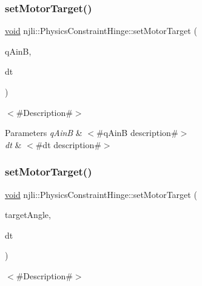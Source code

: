 \subsubsection{\texorpdfstring{set\+Motor\+Target()}{setMotorTarget()}\hspace{0.1cm}{\footnotesize\ttfamily [1/2]}}
{\footnotesize\ttfamily \mbox{\hyperlink{_thread_8h_af1e856da2e658414cb2456cb6f7ebc66}{void}} njli\+::\+Physics\+Constraint\+Hinge\+::set\+Motor\+Target (\begin{DoxyParamCaption}\item[{const bt\+Quaternion \&}]{q\+AinB,  }\item[{\mbox{\hyperlink{_util_8h_a5f6906312a689f27d70e9d086649d3fd}{f32}}}]{dt }\end{DoxyParamCaption})}

$<$\#\+Description\#$>$


\begin{DoxyParams}{Parameters}
{\em q\+AinB} & $<$\#q\+AinB description\#$>$ \\
\hline
{\em dt} & $<$\#dt description\#$>$ \\
\hline
\end{DoxyParams}
\mbox{\label{classnjli_1_1_physics_constraint_hinge_a3d60c1cf68fb85d408d20bfcd49e5df5}} 
\subsubsection{\texorpdfstring{set\+Motor\+Target()}{setMotorTarget()}\hspace{0.1cm}{\footnotesize\ttfamily [2/2]}}
{\footnotesize\ttfamily \mbox{\hyperlink{_thread_8h_af1e856da2e658414cb2456cb6f7ebc66}{void}} njli\+::\+Physics\+Constraint\+Hinge\+::set\+Motor\+Target (\begin{DoxyParamCaption}\item[{\mbox{\hyperlink{_util_8h_a5f6906312a689f27d70e9d086649d3fd}{f32}}}]{target\+Angle,  }\item[{\mbox{\hyperlink{_util_8h_a5f6906312a689f27d70e9d086649d3fd}{f32}}}]{dt }\end{DoxyParamCaption})}

$<$\#\+Description\#$>$


